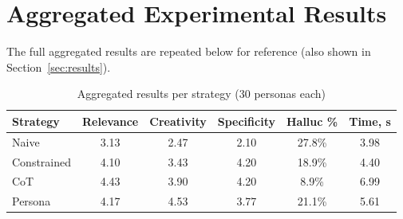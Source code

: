 \section{Aggregated Experimental Results}

The full aggregated results are repeated below for reference (also shown in Section~\ref{sec:results}).

\begin{table}[H]
\centering
\caption{Aggregated results per strategy (30 personas each)}
\label{tab:app-results}
\begin{tabular}{lccccc}
\toprule
\textbf{Strategy} & \textbf{Relevance} & \textbf{Creativity} & \textbf{Specificity} & \textbf{Halluc \%} & \textbf{Time, s} \\
\midrule
Naive       & 3.13 & 2.47 & 2.10 & 27.8\% & 3.98 \\
Constrained & 4.10 & 3.43 & 4.20 & 18.9\% & 4.40 \\
CoT         & 4.43 & 3.90 & 4.20 & 8.9\%  & 6.99 \\
Persona     & 4.17 & 4.53 & 3.77 & 21.1\% & 5.61 \\
\bottomrule
\end{tabular}
\end{table}
